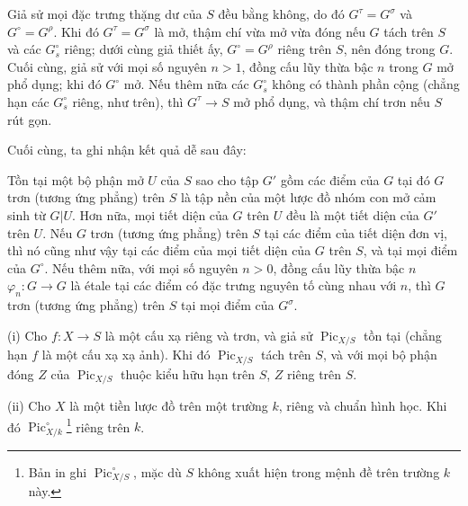  Giả sử mọi đặc trưng thặng dư của $S$ đều bằng không,
do đó $G^\tau=G^\sigma$ và $G^\circ=G^\rho$. Khi đó $G^\tau=G^\sigma$ là mở,
thậm chí vừa mở vừa đóng nếu $G$ tách trên $S$ và các $G_s^\circ$ riêng; dưới
cùng giả thiết ấy, $G^\circ=G^\rho$ riêng trên $S$, nên đóng trong $G$. Cuối
cùng, giả sử với mọi số nguyên $n>1$, đồng cấu lũy thừa bậc $n$ trong $G$ mở
phổ dụng; khi đó $G^\circ$ mở. Nếu thêm nữa các $G_s^\circ$ không có thành
phần cộng (chẳng hạn các $G_s^\circ$ riêng, như trên), thì
$G^\tau\longrightarrow S$ mở phổ dụng, và thậm chí trơn nếu $S$ rút gọn.

Cuối cùng, ta ghi nhận kết quả dễ sau đây:

 Tồn tại một bộ phận mở $U$ của $S$ sao cho tập $G'$ gồm
các điểm của $G$ tại đó $G$ trơn (tương ứng phẳng) trên $S$ là tập nền của một
lược đồ nhóm con mở cảm sinh từ $G|U$. Hơn nữa, mọi tiết diện của $G$ trên $U$
đều là một tiết diện của $G'$ trên $U$.
 Nếu $G$ trơn (tương ứng phẳng) trên $S$ tại các điểm của
tiết diện đơn vị, thì nó cũng như vậy tại các điểm của mọi tiết diện của $G$
trên $S$, và tại mọi điểm của $G^\circ$. Nếu thêm nữa, với mọi số nguyên
$n>0$, đồng cấu lũy thừa bậc $n$
$\varphi_n:G\longrightarrow G$ là étale tại các điểm có đặc trưng nguyên tố
cùng nhau với $n$, thì $G$ trơn (tương ứng phẳng) trên $S$ tại mọi điểm của
$G^\sigma$.



\noindent(i) Cho $f:X\longrightarrow S$ là một cấu xạ riêng và trơn, và giả
sử $\operatorname{Pic}_{X/S}$ tồn tại (chẳng hạn $f$ là một cấu xạ xạ ảnh).
Khi đó $\operatorname{Pic}_{X/S}$ tách trên $S$, và với mọi bộ phận đóng $Z$
của $\operatorname{Pic}_{X/S}$ thuộc kiểu hữu hạn trên $S$, $Z$ riêng trên
$S$.

\noindent(ii) Cho $X$ là một tiền lược đồ trên một trường $k$, riêng và chuẩn
hình học. Khi đó $\operatorname{Pic}_{X/k}^\circ$\footnote{Bản in ghi
$\operatorname{Pic}_{X/S}^\circ$, mặc dù $S$ không xuất hiện trong mệnh đề
trên trường $k$ này.} riêng trên $k$.

